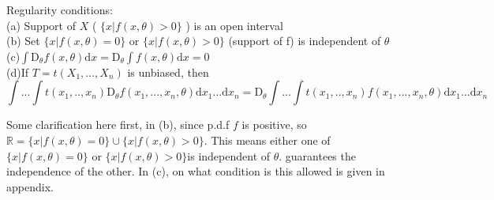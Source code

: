\documentclass[a4paper,12pt]{article}
\begin{document}
Regularity conditions:\\
(a) Support of $X$ ( $\{ x | f(x, \theta) > 0 \}$ ) is an open interval\\
(b) Set $\{ x | f(x, \theta) = 0 \}$ or $\{ x | f(x, \theta) > 0 \}$ (support of f) is independent of $\theta$\\
(c)$\int \mathrm{D}_\theta f(x, \theta) \mathrm{d}x = \mathrm{D}_\theta \int f(x, \theta) \mathrm{d}x = 0$\\
(d)If $T = t(X_1, ..., X_n)$ is unbiased, then
$$\int ... \int t(x_1, .., x_n) \mathrm{D}_\theta f(x_1, ..., x_n, \theta) \mathrm{d}x_1...\mathrm{d}x_n = \mathrm{D}_\theta  \int ... \int t(x_1, .., x_n) f(x_1, ..., x_n, \theta) \mathrm{d}x_1...\mathrm{d}x_n $$ 

Some clarification here first, in (b), since p.d.f $f$ is positive, so $ \mathbb{R} = \{ x | f(x, \theta) = 0 \} \cup \{ x | f(x, \theta) > 0 \}$. This means either one of $\{ x | f(x, \theta) = 0 \}$ or $\{ x | f(x, \theta) > 0 \}$is independent of $\theta$.
 guarantees the independence of the other. In (c), on what condition is this allowed is given in appendix. \\
 
\end{document}
